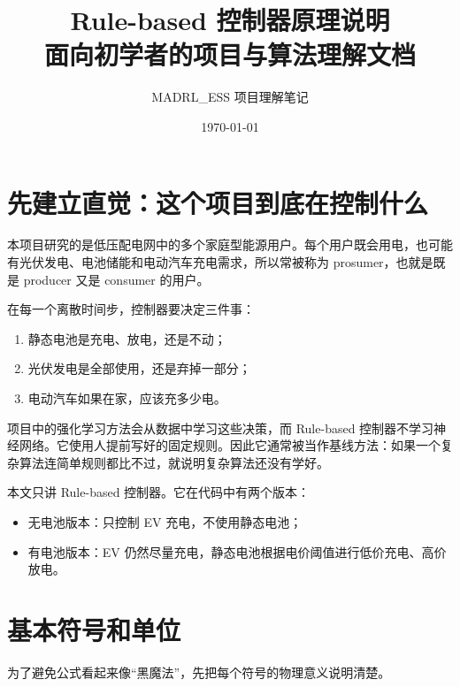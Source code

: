 \documentclass[UTF8,zihao=-4]{ctexart}
\title{Rule-based 控制器原理说明\\{\large 面向初学者的项目与算法理解文档}}
\author{MADRL\_ESS 项目理解笔记}
\date{\today}
\begin{document}
\maketitle
\tableofcontents
\newpage

\section{先建立直觉：这个项目到底在控制什么}

本项目研究的是低压配电网中的多个家庭型能源用户。每个用户既会用电，也可能有光伏发电、电池储能和电动汽车充电需求，所以常被称为 prosumer，也就是既是 producer 又是 consumer 的用户。

在每一个离散时间步，控制器要决定三件事：

\begin{enumerate}
  \item 静态电池是充电、放电，还是不动；
  \item 光伏发电是全部使用，还是弃掉一部分；
  \item 电动汽车如果在家，应该充多少电。
\end{enumerate}

项目中的强化学习方法会从数据中学习这些决策，而 Rule-based 控制器不学习神经网络。它使用人提前写好的固定规则。因此它通常被当作基线方法：如果一个复杂算法连简单规则都比不过，就说明复杂算法还没有学好。

本文只讲 Rule-based 控制器。它在代码中有两个版本：

\begin{itemize}
  \item 无电池版本：只控制 EV 充电，不使用静态电池；
  \item 有电池版本：EV 仍然尽量充电，静态电池根据电价阈值进行低价充电、高价放电。
\end{itemize}

\section{基本符号和单位}

为了避免公式看起来像“黑魔法”，先把每个符号的物理意义说明清楚。
\end{document}
